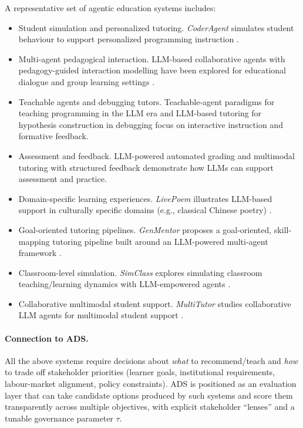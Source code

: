 \documentclass{article}
\begin{document}
A representative set of agentic education systems includes:
\begin{itemize}
    \item {Student simulation and personalized tutoring.} \emph{CoderAgent} simulates student behaviour to support personalized programming instruction \cite{coderagent2025}.
    \item {Multi-agent pedagogical interaction.} LLM-based collaborative agents with pedagogy-guided interaction modelling have been explored for educational dialogue and group learning settings \cite{collabAgents2025}.
    \item {Teachable agents and debugging tutors.} Teachable-agent paradigms for teaching programming in the LLM era \cite{teachProg2025} and LLM-based tutoring for hypothesis construction in debugging \cite{ma2023hypocompass} focus on interactive instruction and formative feedback.
    \item {Assessment and feedback.} LLM-powered automated grading \cite{llmGrading2025} and multimodal tutoring with structured feedback \cite{handByHand2025} demonstrate how LLMs can support assessment and practice.
    \item {Domain-specific learning experiences.} \emph{LivePoem} illustrates LLM-based support in culturally specific domains (e.g., classical Chinese poetry) \cite{livepoem2025}.
    \item {Goal-oriented tutoring pipelines.} \emph{GenMentor} proposes a goal-oriented, skill-mapping tutoring pipeline built around an LLM-powered multi-agent framework \cite{wang2025genmentor}.
    \item {Classroom-level simulation.} \emph{SimClass} explores simulating classroom teaching/learning dynamics with LLM-empowered agents \cite{zhang2024simclass}.
    \item {Collaborative multimodal student support.} \emph{MultiTutor} studies collaborative LLM agents for multimodal student support \cite{sun2025multitutor}.
\end{itemize}

\paragraph{Connection to ADS.}
All the above systems require decisions about \emph{what} to recommend/teach and \emph{how} to trade off stakeholder priorities (learner goals, institutional requirements, labour-market alignment, policy constraints).
ADS is positioned as an evaluation layer that can take candidate options produced by such systems and score them transparently across multiple objectives, with explicit stakeholder ``lenses'' and a tunable governance parameter $\tau$.
\end{document}
